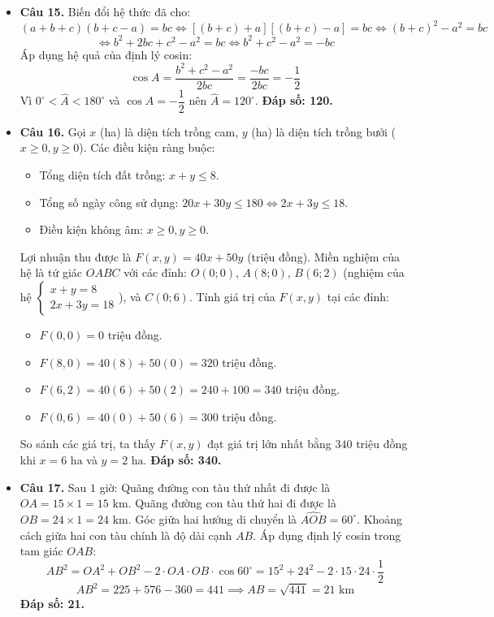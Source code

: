 \documentclass[12pt,a4paper]{article}
\begin{document}
\begin{itemize}[leftmargin=0.6cm, itemsep=4pt]
\item \textbf{Câu 15.} Biến đổi hệ thức đã cho:
$$(a + b + c)(b + c - a) = bc \iff [(b + c) + a][(b + c) - a] = bc \iff (b + c)^2 - a^2 = bc$$
$$\iff b^2 + 2bc + c^2 - a^2 = bc \iff b^2 + c^2 - a^2 = -bc$$
Áp dụng hệ quả của định lý cosin:
$$\cos A = \dfrac{b^2 + c^2 - a^2}{2bc} = \dfrac{-bc}{2bc} = -\dfrac{1}{2}$$
Vì $0^\circ < \widehat{A} < 180^\circ$ và $\cos A = -\dfrac{1}{2}$ nên $\widehat{A} = 120^\circ$. \textbf{Đáp số: 120.}

\item \textbf{Câu 16.} Gọi $x$ (ha) là diện tích trồng cam, $y$ (ha) là diện tích trồng bưởi ($x \ge 0, y \ge 0$).
Các điều kiện ràng buộc:
\begin{itemize}
    \item Tổng diện tích đất trồng: $x + y \le 8$.
    \item Tổng số ngày công sử dụng: $20x + 30y \le 180 \iff 2x + 3y \le 18$.
    \item Điều kiện không âm: $x \ge 0, y \ge 0$.
\end{itemize}
Lợi nhuận thu được là $F(x, y) = 40x + 50y$ (triệu đồng).
Miền nghiệm của hệ là tứ giác $OABC$ với các đỉnh:
$O(0; 0)$, $A(8; 0)$, $B(6; 2)$ (nghiệm của hệ $\begin{cases} x + y = 8 \\ 2x + 3y = 18 \end{cases}$), và $C(0; 6)$.
Tính giá trị của $F(x, y)$ tại các đỉnh:
\begin{itemize}
    \item $F(0, 0) = 0$ triệu đồng.
    \item $F(8, 0) = 40(8) + 50(0) = 320$ triệu đồng.
    \item $F(6, 2) = 40(6) + 50(2) = 240 + 100 = 340$ triệu đồng.
    \item $F(0, 6) = 40(0) + 50(6) = 300$ triệu đồng.
\end{itemize}
So sánh các giá trị, ta thấy $F(x, y)$ đạt giá trị lớn nhất bằng $340$ triệu đồng khi $x = 6\text{ ha}$ và $y = 2\text{ ha}$. \textbf{Đáp số: 340.}

\item \textbf{Câu 17.} Sau $1$ giờ:
Quãng đường con tàu thứ nhất đi được là $OA = 15 \times 1 = 15\text{ km}$.
Quãng đường con tàu thứ hai đi được là $OB = 24 \times 1 = 24\text{ km}$.
Góc giữa hai hướng di chuyển là $\widehat{AOB} = 60^\circ$.
Khoảng cách giữa hai con tàu chính là độ dài cạnh $AB$. Áp dụng định lý cosin trong tam giác $OAB$:
$$AB^2 = OA^2 + OB^2 - 2 \cdot OA \cdot OB \cdot \cos 60^\circ = 15^2 + 24^2 - 2 \cdot 15 \cdot 24 \cdot \dfrac{1}{2}$$
$$AB^2 = 225 + 576 - 360 = 441 \implies AB = \sqrt{441} = 21\text{ km}$$
\textbf{Đáp số: 21.}


\end{itemize}
\end{document}
